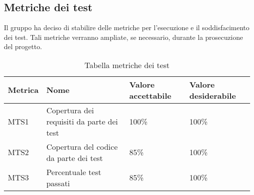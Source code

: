 \subsection{Metriche dei test}
Il gruppo ha deciso di stabilire delle metriche per l'esecuzione e il soddisfacimento dei test. Tali metriche verranno ampliate, se necessario, durante la prosecuzione del progetto.


{

\centering
\renewcommand{\arraystretch}{2}
\begin{longtable}{C{2cm} C{6.3cm} C{3cm} C{3cm}}
\caption{Tabella metriche dei test}\\
\textbf{Metrica} &
\textbf{Nome} &
\textbf{Valore accettabile}&
\textbf{Valore desiderabile}\\
\endhead


MTS1 & Copertura dei requisiti da parte dei test & 100\% & 100\%\\
MTS2 & Copertura del codice da parte dei test & 85\% & 100\%\\
MTS3 & Percentuale test passati & 85\% & 100\%\\


\end{longtable}
}
